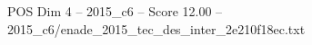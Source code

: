 \begin{textsample}{POS Dim 4 – 2015\_c6 – Score 12.00 – 2015\_c6/enade\_2015\_tec\_des\_inter\_2e210f18ec.txt}
\end{textsample}
